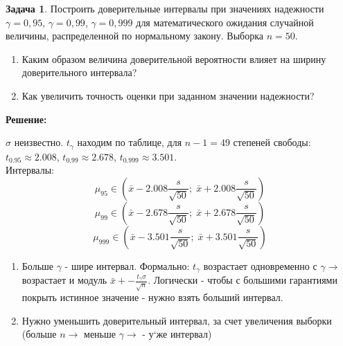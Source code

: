 \documentclass[a4paper,11pt]{article}
\newenvironment{shdd}{\begin{mdframed}[backgroundcolor=shadecolor]}{\end{mdframed}}
\theoremstyle{definition}
\newtheorem{problem}{Задача}\setlength{\parindent}{0pt}
\newenvironment{solution}
{\begin{shdd}\textbf{Решение:}\par\setlength{\parindent}{0pt}}
{\end{shdd}}
\newenvironment{answer}
{\par\noindent\textbf{Ответ:}}
{\par}
\begin{document}
\newpage
\begin{problem}
    Построить доверительные интервалы при значениях надежности \(\gamma=0,95\), 
    \(\gamma=0,99\), \(\gamma=0,999\) для математического ожидания случайной величины, 
    распределенной по нормальному закону. Выборка \(n=50\).
        \begin{enumerate}
            \item Каким образом величина доверительной вероятности влияет на ширину 
            доверительного интервала? 
            \item Как увеличить точность оценки при заданном значении надежности?
        \end{enumerate} 
    \begin{solution}
        \(\sigma\) неизвестно. \(t_\gamma\) находим по таблице, для \(n - 1 = 49\) степеней свободы:
        \\ \(t_{0.95} \approx 2.008\), \(t_{0.99} \approx 2.678\), \(t_{0.999} \approx 3.501\).
        \\ Интервалы: 
        \[
        \mu_{95}\in (\bar{x} - 2.008\frac{s}{\sqrt{50}};\; \bar{x} + 2.008\frac{s}{\sqrt{50}})
        \]
        \[
        \mu_{99}\in (\bar{x} - 2.678\frac{s}{\sqrt{50}};\; \bar{x} + 2.678\frac{s}{\sqrt{50}})
        \]
        \[
        \mu_{999}\in (\bar{x} - 3.501\frac{s}{\sqrt{50}};\; \bar{x} + 3.501\frac{s}{\sqrt{50}})
        \]

        \begin{enumerate}
            \item Больше \(\gamma\) - шире интервал. Формально: \(t_{\gamma}\) возрастает одновременно 
                  с \(\gamma\rightarrow\) возрастает и модуль \(\bar{x} +- \frac{t_{\gamma}\sigma}{\sqrt{n}}\).
                  Логически - чтобы с большими гарантиями покрыть истинное значение - нужно взять больший интервал.
            \item Нужно уменьшить доверительный интервал, за счет увеличения выборки 
            (больше \(n\rightarrow\) меньше \(\gamma\rightarrow\) - у`же интервал)
        \end{enumerate}
    \end{solution}

\end{problem}
\end{document}
